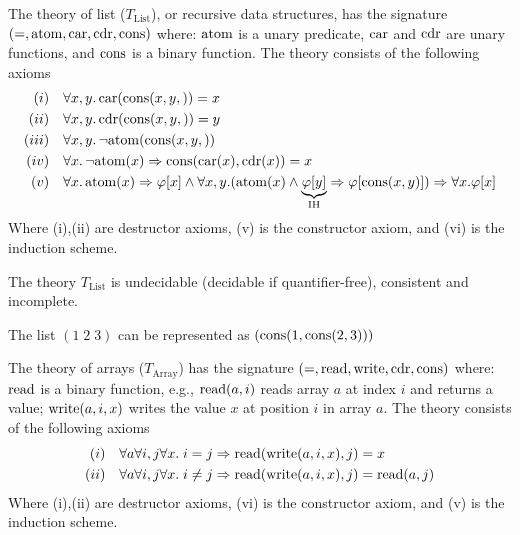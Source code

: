 \begin{definition}
    The theory of list ($T_{\mathrm{List}}$), or recursive data structures, has the signature $(=, \mathrm{atom}, \mathrm{car}, \mathrm{cdr}, \mathrm{cons})$ where: $\mathrm{atom}$ is a unary predicate, 
    $\mathrm{car}$ and $\mathrm{cdr}$ are unary functions, and $\mathrm{cons}$ is a binary function.
    The theory consists of the following axioms
    \begin{align*}
        (i) \quad &\forall x, y. \, \mathrm{car}(\mathrm{cons}(x,y,)) = x \\
        (ii) \quad &\forall x, y. \, \mathrm{cdr}(\mathrm{cons}(x,y,)) = y \\
        (iii) \quad &\forall x, y. \, \neg\mathrm{atom}(\mathrm{cons}(x,y,))  \\
        (iv) \quad &\forall x. \, \neg\mathrm{atom}(x)  \Rightarrow \mathrm{cons}(\mathrm{car}(x), \mathrm{cdr}(x))=x \\
        (v) \quad &\forall x. \, \mathrm{atom}(x)  \Rightarrow \varphi[x] \land \forall x,y .(\mathrm{atom}(x) \land \underbrace{\varphi[y]}_{\text{IH}} \Rightarrow \varphi[\mathrm{cons}(x,y)]) \Rightarrow \forall x. \varphi[x] 
    \end{align*}
    Where (i),(ii) are destructor axioms, (v) is the constructor axiom, and (vi) is the induction scheme. 
\end{definition}

\begin{theorem}
    The theory $T_{\mathrm{List}}$ is undecidable (decidable if quantifier-free), consistent and incomplete.
\end{theorem}
\begin{example}
    The list $(1\; 2 \; 3)$ can be represented as $(\mathrm{cons}(1, \mathrm{cons}(2,3)))$
\end{example}


\begin{definition}
    The theory of arrays ($T_{\mathrm{Array}}$) has the signature $(=, \mathrm{read}, \mathrm{write}, \mathrm{cdr}, \mathrm{cons})$ where: $\mathrm{read}$ is a binary function, e.g., $\mathrm{read}(a,i)$ reads array $a$ at index $i$ and returns a value; $\mathrm{write}(a,i,x)$ writes the value $x$ at position $i$ in array $a$. 
    The theory consists of the following axioms
    \begin{align*}
        (i) \quad & \forall a\forall i,j \forall x . \; i=j \Rightarrow \mathrm{read}(\mathrm{write}(a, i, x),j) = x \\
        (ii) \quad & \forall a\forall i,j \forall x . \; i\ne j \Rightarrow \mathrm{read}(\mathrm{write}(a, i, x),j) = \mathrm{read}(a, j) \\        
    \end{align*}
    Where (i),(ii) are destructor axioms, (vi) is the constructor axiom, and (v) is the induction scheme. 
\end{definition}


